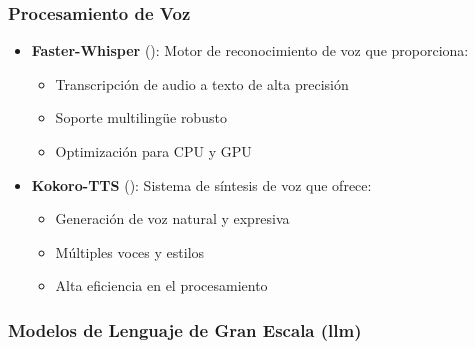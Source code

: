 \subsubsection{Procesamiento de Voz}
\begin{itemize}
	\item \textbf{Faster-Whisper} (\cite{peng2024owsmv31betterfaster}): Motor de reconocimiento de voz que proporciona:
	      \begin{itemize}
		      \item Transcripción de audio a texto de alta precisión
		      \item Soporte multilingüe robusto
		      \item Optimización para CPU y GPU
	      \end{itemize}

	\item \textbf{Kokoro-TTS} (\cite{hexgrad_2025}): Sistema de síntesis de voz que ofrece:
	      \begin{itemize}
		      \item Generación de voz natural y expresiva
		      \item Múltiples voces y estilos
		      \item Alta eficiencia en el procesamiento
	      \end{itemize}
\end{itemize}

\subsubsection{Modelos de Lenguaje de Gran Escala (\gls{llm})}

